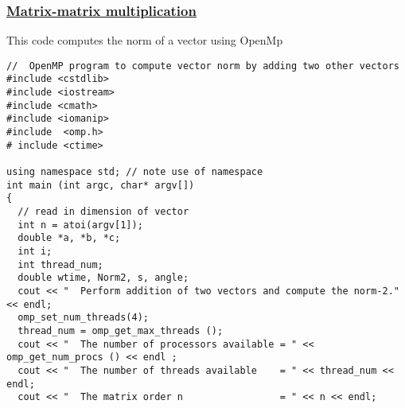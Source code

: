 \documentclass{beamer}
\begin{document}
\begin{frame}
\frametitle{\href{{https://github.com/CompPhysics/ComputationalPhysicsMSU/blob/master/doc/Programs/ParallelizationOpenMP/OpenMPvectornorm.cpp}}{Matrix-matrix multiplication}}

This code computes the norm of a vector using OpenMp


























































\begin{verbatim}
//  OpenMP program to compute vector norm by adding two other vectors
#include <cstdlib>
#include <iostream>
#include <cmath>
#include <iomanip>
#include  <omp.h>
# include <ctime>

using namespace std; // note use of namespace
int main (int argc, char* argv[])
{
  // read in dimension of vector
  int n = atoi(argv[1]);
  double *a, *b, *c;
  int i;
  int thread_num;
  double wtime, Norm2, s, angle;
  cout << "  Perform addition of two vectors and compute the norm-2." << endl;
  omp_set_num_threads(4);
  thread_num = omp_get_max_threads ();
  cout << "  The number of processors available = " << omp_get_num_procs () << endl ;
  cout << "  The number of threads available    = " << thread_num <<  endl;
  cout << "  The matrix order n                 = " << n << endl;


\end{verbatim}
\end{frame}
\end{document}
